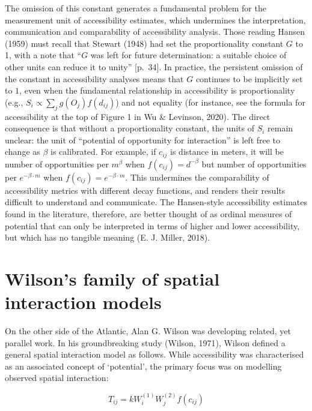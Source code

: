 \documentclass[
11pt, %
oneside, %
english, %
singlespacing, %
]{macthesis} %
\begin{document}
The omission of this constant generates a fundamental problem for the measurement unit of accessibility estimates, which undermines the interpretation, communication and comparability of accessibility analysis. Those reading Hansen (1959) must recall that Stewart (1948) had set the proportionality constant \(G\) to 1, with a note that ``\(G\) was left for future determination: a suitable choice of other units can reduce it to unity'' {[}p.~34{]}. In practice, the persistent omission of the constant in accessibility analyses means that \(G\) continues to be implicitly set to \(1\), even when the fundamental relationship in accessibility is proportionality (e.g., \(S_{i} \propto \sum_j g(O_j)f(d_{ij})\)) and not equality (for instance, see the formula for accessibility at the top of Figure 1 in Wu \& Levinson, 2020). The direct consequence is that without a proportionality constant, the units of \(S_i\) remain unclear: the unit of ``potential of opportunity for interaction'' is left free to change as \(\beta\) is calibrated. For example, if \(c_{ij}\) is distance in meters, it will be number of opportunities per \(m^{\beta}\) when \(f(c_{ij}) = d^{-\beta}\) but number of opportunities per \(e^{-\beta\cdot m}\) when \(f(c_{ij}) = e^{-\beta\cdot m}\). This undermines the comparability of accessibility metrics with different decay functions, and renders their results difficult to understand and communicate. The Hansen-style accessibility estimates found in the literature, therefore, are better thought of as ordinal measures of potential that can only be interpreted in terms of higher and lower accessibility, but which has no tangible meaning (E. J. Miller, 2018).

\section{Wilson's family of spatial interaction models}\label{wilsons-family-of-spatial-interaction-models}

On the other side of the Atlantic, Alan G. Wilson was developing related, yet parallel work. In his groundbreaking study (Wilson, 1971), Wilson defined a general spatial interaction model as follows. While accessibility was characterised as an associated concept of `potential', the primary focus was on modelling observed spatial interaction:

\begin{equation}
\label{eq:phys-gravity-model}
T_{ij} = k W_i^{(1)} W_j^{(2)} f(c_{ij})
\end{equation} 
\end{document}
